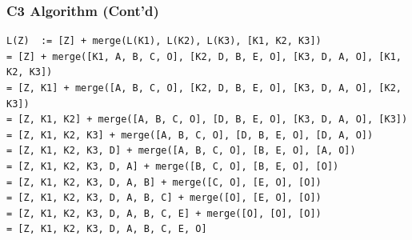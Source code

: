 \documentclass{../py-lecture}
\begin{document}
\begin{frame}[fragile]
	\frametitle{C3 Algorithm (Cont'd)}
  \begin{verbatim}
L(Z)  := [Z] + merge(L(K1), L(K2), L(K3), [K1, K2, K3])
= [Z] + merge([K1, A, B, C, O], [K2, D, B, E, O], [K3, D, A, O], [K1, K2, K3])
= [Z, K1] + merge([A, B, C, O], [K2, D, B, E, O], [K3, D, A, O], [K2, K3])
= [Z, K1, K2] + merge([A, B, C, O], [D, B, E, O], [K3, D, A, O], [K3])
= [Z, K1, K2, K3] + merge([A, B, C, O], [D, B, E, O], [D, A, O])
= [Z, K1, K2, K3, D] + merge([A, B, C, O], [B, E, O], [A, O])
= [Z, K1, K2, K3, D, A] + merge([B, C, O], [B, E, O], [O])
= [Z, K1, K2, K3, D, A, B] + merge([C, O], [E, O], [O])
= [Z, K1, K2, K3, D, A, B, C] + merge([O], [E, O], [O])
= [Z, K1, K2, K3, D, A, B, C, E] + merge([O], [O], [O])
= [Z, K1, K2, K3, D, A, B, C, E, O]
  \end{verbatim}
\end{frame}
\end{document}
